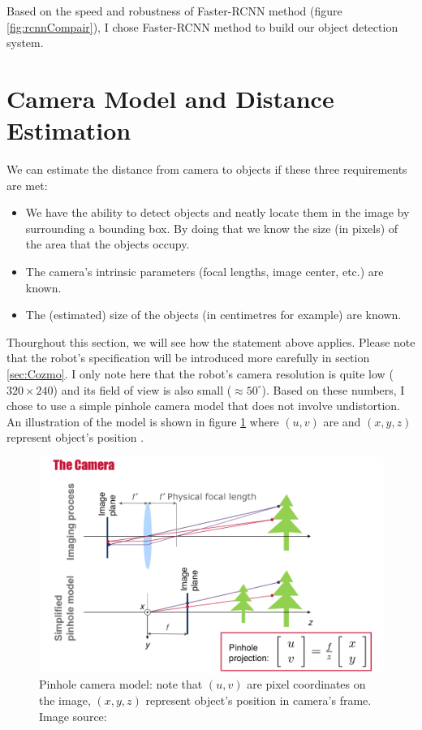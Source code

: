 Based on the speed and robustness of Faster-RCNN method (figure \ref{fig:rcnnCompair}), I chose Faster-RCNN method to build our object detection system.


\section{Camera Model and Distance Estimation}
\label{sec:camModel}
We can estimate the distance from camera to objects if these three requirements are met: 
\begin{itemize}
	\item We have the ability to detect objects and neatly locate them in the image by surrounding a bounding box. By doing that we know the size (in pixels) of the area that the objects occupy.
	\item The camera's intrinsic parameters (focal lengths, image center, etc.) are known.
	\item The (estimated) size of the objects (in centimetres for example) are known.
\end{itemize}
Thourghout this section, we will see how the statement above applies. Please note that the robot's specification will be introduced more carefully in section \ref{sec:Cozmo}. I only note here that the robot's camera resolution is quite low ($320 \times 240$) and its field of view is also small ($\approx 50 ^{\circ}$). Based on these numbers, I chose to use a simple pinhole camera model that does not involve undistortion. An illustration of the model is shown in figure \ref{fig:pinhole} where $(u, v)$ are  and $(x,y,z)$ represent object's position .

\begin{figure}[tb]
	\centering
	\includegraphics[width=0.9\hsize]{./figures/pinhole}
	\caption{Pinhole camera model: note that $(u, v)$ are pixel coordinates on the image, $(x,y,z)$ represent object's position in camera's frame. Image source: \cite{c433}}
	\label{fig:pinhole}
\end{figure}

